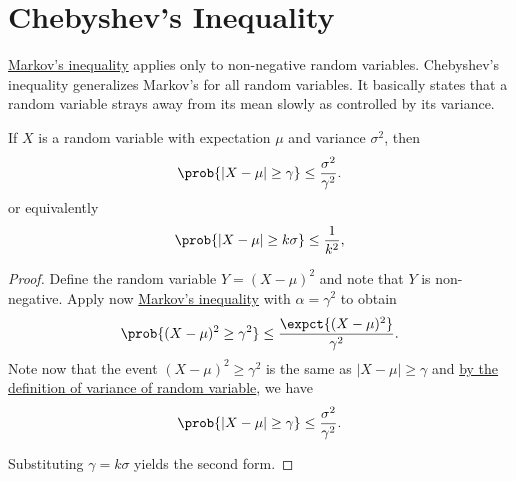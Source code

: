 \section{Chebyshev's Inequality}
\label{sec:probability::expectation::chebyshev}

\begin{cluster}
\label{grp:grm:probability::expectation::probability}

\begin{gram}
\label{grm:probability::expectation::probability}
\href{thm:probability::expectation::markov-inequality}{Markov's inequality} applies only to non-negative random variables.  Chebyshev's inequality generalizes Markov's for all random variables.  It basically states that a random variable strays away from its mean slowly as controlled by its variance.

\end{gram}
\end{cluster}

\begin{flex}
\label{grp:thm:probability::expectation::chebyshev-inequality}

\begin{theorem}
\label{thm:probability::expectation::chebyshev-inequality}
If $X$ is a random variable with expectation $\mu$ and variance $\sigma^2$,  
then
\[ 
\prob{|X - \mu| \geq \gamma} \leq \frac{\sigma^2}{\gamma^2}. 
\]
or equivalently
\[ 
\prob{|X - \mu| \geq k\sigma} \leq \frac{1}{k^2}, 
\]

\end{theorem}

\begin{proof}
\label{prf:probability::expectation::define}
Define the random variable $Y = (X - \mu)^2$  and note that $Y$ is non-negative.  
Apply now 
\href{thm:probability::expectation::markov-inequality}{Markov's inequality}
with $\alpha = \gamma^2$ to obtain
\[
\prob{(X - \mu)^2 \geq \gamma^2} \leq \frac{\expct{(X - \mu)^2}}{\gamma^2}. 
\]
Note now that the event $(X - \mu)^2 \geq \gamma^2$ is the same as $| X - \mu| \geq \gamma$ and
\href{def:probability::variance}{by the definition of variance of random variable},
we have
\[ 
\prob{|X - \mu| \geq \gamma} \leq \frac{\sigma^2}{\gamma^2}. 
\]

Substituting $\gamma = k \sigma$ yields the second form.

\end{proof}
\end{flex}

